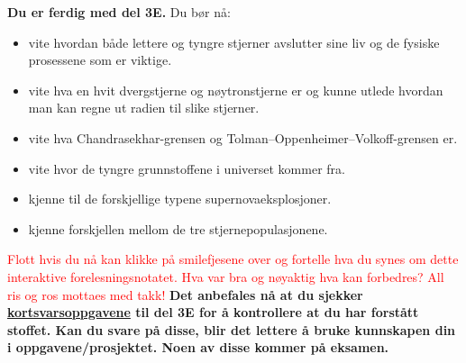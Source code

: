 \documentclass{beamer}
\let\hrefori\href
\renewcommand{\href}[2]{{\setlength{\fboxsep}{1pt}\colorbox{sunset}{\hrefori{#1}{#2}}}}
\newcommand{\pagebutton}[1]{\setbeamertemplate{button}{\tikz\node[inner xsep = 5pt, draw = structure!90, fill = green(ryb), rounded corners = 8pt]{\color{amber}\Large\insertbuttontext};}\beamerbutton{#1}}
\begin{document}
\begin{frame}
\label{oppsummering}
\hyperlink{feil_nd4}{\pagebutton{\small Forrige side}}\href{https://nettskjema.no/a/168692}{ \Changey[1][yellow]{-2}}
{\bf  Du er ferdig med del 3E.} Du bør nå:
\begin{itemize}
\item  vite hvordan både lettere og tyngre stjerner avslutter sine liv og de fysiske prosessene som er viktige.
\item  vite hva en hvit dvergstjerne og nøytronstjerne er og kunne utlede hvordan man kan regne ut radien til slike stjerner.
\item  vite hva Chandrasekhar-grensen og Tolman–Oppenheimer–Volkoff-grensen er.
\item  vite hvor de tyngre grunnstoffene i universet kommer fra.
\item  kjenne til de forskjellige typene supernovaeksplosjoner.
\item  kjenne forskjellen mellom de tre stjernepopulasjonene.
\end{itemize}
\textcolor{red}{Flott hvis du nå kan klikke på smilefjesene over og fortelle hva du synes om dette interaktive forelesningsnotatet. Hva var bra og nøyaktig hva kan forbedres? All ris og ros mottaes med takk!}
{\bf Det anbefales nå at du sjekker \href{https://www.uio.no/studier/emner/matnat/astro/AST2000/h21/undervisningsmateriell/kortsvarsoppgaver/del3e.pdf}{kortsvarsoppgavene} til del 3E for å kontrollere at du har forstått stoffet. Kan du svare på disse, blir det lettere å bruke kunnskapen din i oppgavene/prosjektet. Noen av disse kommer på eksamen.}
\end{frame}
\end{document}
